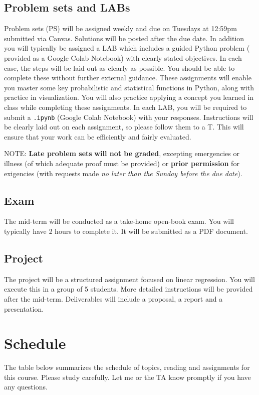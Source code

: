 \documentclass[11pt,twoside]{article}
\numberwithin{equation}{section}
\newcommand{\?}{\stackrel{?}{=}}
\newcommand{\rd}{\color{red}}
\begin{document}
\subsection{Problem sets and LABs}
Problem sets (PS) will be assigned weekly and due on Tuesdays at 12:59pm submitted via Canvas.
Solutions will be posted after the due date.
In addition you will typically be assigned a LAB which includes a guided Python problem (
   provided as a Google Colab Notebook) with clearly stated objectives.  
In each case, the steps will be laid out as clearly as possible.  You should
be able to complete these without further external guidance.  
These assignments will enable you master some key probabilistic and statistical functions in Python, along with practice in visualization. 
You will also practice applying a concept you learned in class while completing these assignments.
In each LAB, you will be required to submit a %
\texttt{.ipynb} (Google Colab Notebook) with your responses.
Instructions will be clearly laid out on each assignment, so please follow them to a T.  This will ensure that your work
can be efficiently and fairly evaluated.

NOTE: {\rd \bf Late problem sets} \textbf{will not be graded}, excepting emergencies or illness (of which adequate proof must be provided) or {\bf  prior permission} for exigencies (with requests made 
{\it no later than the Sunday before the due date}). 


\subsection{Exam}
The mid-term will be conducted as a  take-home open-book exam. You will typically have 2 hours to complete it.
It will be submitted as a PDF document.

\subsection{Project}
The project will be a structured assignment focused on linear regression. 
You will execute this in a group of 5 students.
More detailed instructions will be provided after the mid-term.
Deliverables will include a proposal, a report and a presentation.









\eject
\section{Schedule}
The table below summarizes the schedule of topics, reading and assignments for this course.
Please study carefully.
Let me or the TA know promptly if you have any questions.
\end{document}
